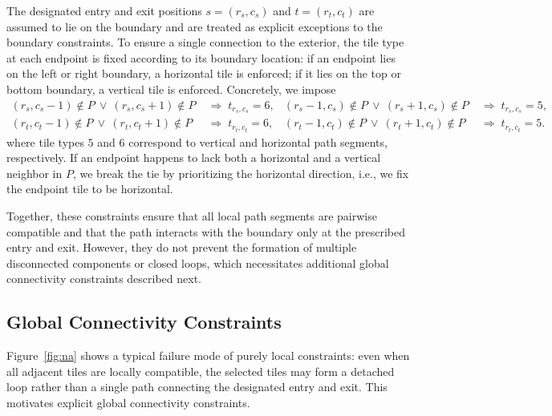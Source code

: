 \documentclass[letterpaper,11pt]{article}
\begin{document}
The designated entry and exit positions \(s=(r_s,c_s)\) and
\(t=(r_t,c_t)\) are assumed to lie on the boundary and are treated as
explicit exceptions to the boundary constraints. To ensure a single
connection to the exterior, the tile type at each endpoint is fixed
according to its boundary location: if an endpoint lies on the left or
right boundary, a horizontal tile is enforced; if it lies on the top
or bottom boundary, a vertical tile is enforced. Concretely, we impose
\[
\begin{aligned}
(r_s,c_s-1)\notin P \ \vee\ (r_s,c_s+1)\notin P
&\;\Rightarrow\; t_{r_s,c_s}=6, &
(r_s-1,c_s)\notin P \ \vee\ (r_s+1,c_s)\notin P
&\;\Rightarrow\; t_{r_s,c_s}=5, \\
(r_t,c_t-1)\notin P \ \vee\ (r_t,c_t+1)\notin P
&\;\Rightarrow\; t_{r_t,c_t}=6, &
(r_t-1,c_t)\notin P \ \vee\ (r_t+1,c_t)\notin P
&\;\Rightarrow\; t_{r_t,c_t}=5.
\end{aligned}
\]
where tile types \(5\) and \(6\) correspond to vertical and horizontal
path segments, respectively. If an endpoint happens to lack both a
horizontal and a vertical neighbor in \(P\), we break the tie by
prioritizing the horizontal direction, i.e., we fix the endpoint tile
to be horizontal.


Together, these constraints ensure that all local path segments are
pairwise compatible and that the path interacts with the boundary only
at the prescribed entry and exit. However, they do not prevent the
formation of multiple disconnected components or closed loops, which
necessitates additional global connectivity constraints described
next.

\subsection*{Global Connectivity Constraints}
Figure~\ref{fig:na} shows a typical failure mode of purely local
constraints: even when all adjacent tiles are locally compatible, the
selected tiles may form a detached loop rather than a single path
connecting the designated entry and exit. This motivates explicit
global connectivity constraints.
\end{document}
